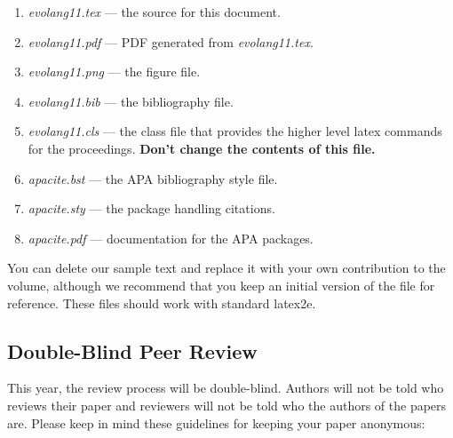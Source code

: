 \documentclass{evolang11}
\begin{document}
\begin{enumerate}

\item {\em evolang11.tex} --- the source for this document. 

\item {\em evolang11.pdf} --- PDF generated from {\em evolang11.tex}.

\item {\em evolang11.png} --- the figure file.

\item {\em evolang11.bib} --- the bibliography file.

\item {\em evolang11.cls} --- the class file that provides the higher
level latex commands for the proceedings. \textbf{Don't change the contents of this file.}
 
\item {\em apacite.bst} --- the APA bibliography style file.
  
\item {\em apacite.sty} --- the package handling citations.

\item {\em apacite.pdf} --- documentation for the APA packages.

\end{enumerate}

You can delete our sample text and replace it with your own
contribution to the volume, although we recommend that you keep an
initial version of the file for reference.  These files should work with
standard latex2e.

\subsection{Double-Blind Peer Review}

This year, the review process will be double-blind.  Authors will not be told who reviews their paper and reviewers will not be told who the authors of the papers are.  Please keep in mind these guidelines for keeping your paper anonymous:
\end{document}

